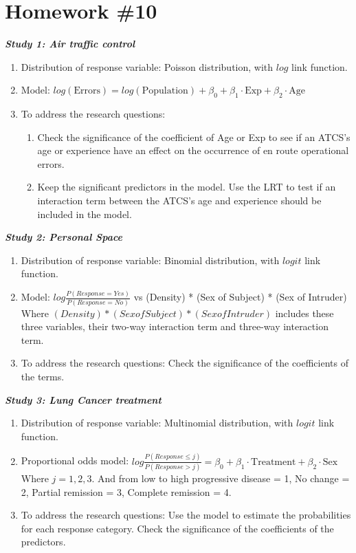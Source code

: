 \documentclass[12pt,fleqn]{article}
\theoremstyle{definition}
\begin{document}
\rhead{} %


\section*{Homework \#10}
\textbf{\textit{Study 1: Air traffic control}}
	\begin{enumerate}
		\item Distribution of response variable: Poisson distribution, with $log$ link function.
		\item Model: $log(\mbox{Errors}) = log(\mbox{Population}) + \beta_0 + \beta_1 \cdot \mbox{Exp} + \beta_2 \cdot \mbox{Age} $
		\item To address the research questions:
			\begin{enumerate}[(1)]
				\item Check the significance of the coefficient of Age or Exp to see if an ATCS's age or experience have an effect on the occurrence of en route operational errors. 
				\item Keep the significant predictors in the model. Use the LRT to test if an interaction term between the ATCS's age and experience should be included in the model.
			\end{enumerate}
	\end{enumerate}
\textbf{\textit{Study 2: Personal Space}}
	\begin{enumerate}
		\item Distribution of response variable: Binomial distribution, with $logit$ link function.
		\item Model: $log\frac{P(Response=Yes)}{P(Response=No)}$ vs (Density) * (Sex of Subject) * (Sex of Intruder)\\
			  Where $(Density) * (Sex of Subject) * (Sex of Intruder) $ includes these three variables, their two-way interaction term and three-way interaction term.
		\item To address the research questions: Check the significance of the coefficients of the terms.
	\end{enumerate}
\textbf{\textit{Study 3: Lung Cancer treatment}}
	\begin{enumerate}
		\item Distribution of response variable: Multinomial distribution, with $logit$ link function.
		\item Proportional odds model: $log\frac{P(Response\leq j)}{P(Response > j)} = \beta_0 + \beta_1 \cdot \mbox{Treatment} + \beta_2 \cdot \mbox{Sex}$\\
			  Where $ j = 1,2,3$. And from low to high progressive disease = 1, No change = 2, Partial remission = 3, Complete remission = 4. 
		\item To address the research questions: Use the model to estimate the probabilities for each response category. Check the significance of the coefficients of the predictors. 
	\end{enumerate}
\end{document}

